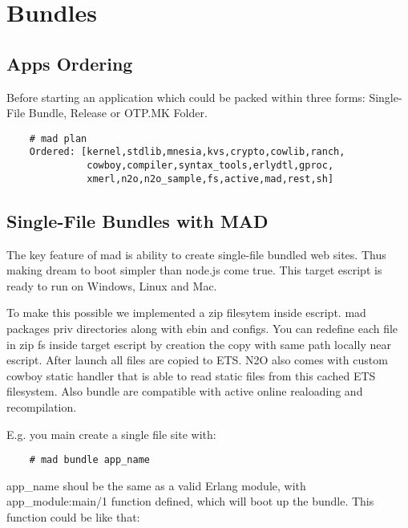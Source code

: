 \section{Bundles}



\subsection{Apps Ordering}

Before starting an application which could be
packed within three forms: Single-File Bundle, Release or OTP.MK Folder.


\vspace{1\baselineskip}
\begin{lstlisting}
    # mad plan
    Ordered: [kernel,stdlib,mnesia,kvs,crypto,cowlib,ranch,
              cowboy,compiler,syntax_tools,erlydtl,gproc,
              xmerl,n2o,n2o_sample,fs,active,mad,rest,sh]
\end{lstlisting}
\vspace{1\baselineskip}

\subsection{Single-File Bundles with MAD}

The key feature of mad is ability to create single-file bundled web sites.
Thus making dream to boot simpler than node.js come true.
This target escript is ready to run on Windows, Linux and Mac.

To make this possible we implemented a zip filesytem inside escript.
mad packages priv directories along with ebin and configs.
You can redefine each file in zip fs inside target
escript by creation the copy with same path locally near escript.
After launch all files are copied to ETS.
N2O also comes with custom cowboy static handler that is able to
read static files from this cached ETS filesystem.
Also bundle are compatible with active online realoading and recompilation.

E.g. you main create a single file site with:

\vspace{1\baselineskip}
\begin{lstlisting}
    # mad bundle app_name
\end{lstlisting}
\vspace{1\baselineskip}

app\_name shoul be the same as a valid Erlang module, with app\_module:main/1
function defined, which will boot up the bundle. This function could be like that:

